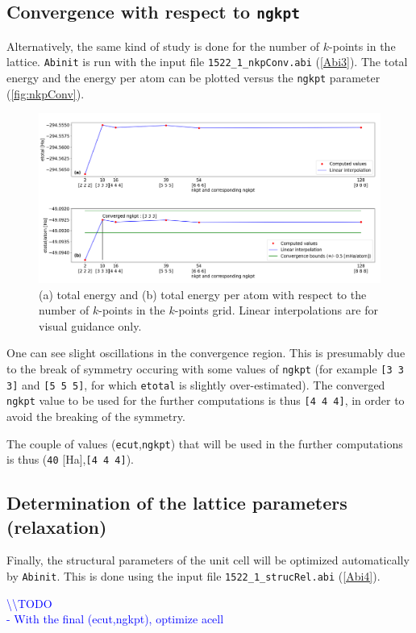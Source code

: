 \documentclass[11pt,a4paper]{article}
\begin{document}
\subsection{Convergence with respect to \texttt{ngkpt}}
Alternatively, the same kind of study is done for the number of $k$-points in the lattice. \texttt{Abinit} is run with the input file \texttt{1522\_1\_nkpConv.abi} (\autoref{Abi3}). The total energy and the energy per atom can be plotted versus the \texttt{ngkpt} parameter (\autoref{fig:nkpConv}).
\begin{figure}[H]
\includegraphics[width=\textwidth]{images/nkpConv}
\caption{(a) total energy and (b) total energy per atom with respect to the number of $k$-points in the $k$-points grid.
Linear interpolations are for visual guidance only.}
\label{fig:nkpConv}
\end{figure}
One can see slight oscillations in the convergence region. This is presumably due to the break of symmetry occuring with some values of \texttt{ngkpt} (for example \texttt{[3 3 3]} and \texttt{[5 5 5]}, for which \texttt{etotal} is slightly over-estimated). The converged \texttt{ngkpt} value to be used for the further computations is thus \texttt{[4 4 4]}, in order to avoid the breaking of the symmetry. 

The couple of values (\texttt{ecut},\texttt{ngkpt}) that will be used in the further computations is thus (\texttt{40} [Ha],\texttt{[4 4 4]}).
\subsection{Determination of the lattice parameters (relaxation)}
Finally, the structural parameters of the unit cell will be optimized automatically by \texttt{Abinit}. This is done using the input file \texttt{1522\_1\_strucRel.abi} (\autoref{Abi4}).

\textcolor{blue}{
\textbackslash\textbackslash TODO\\
- With the final (ecut,ngkpt), optimize acell}
\end{document}
